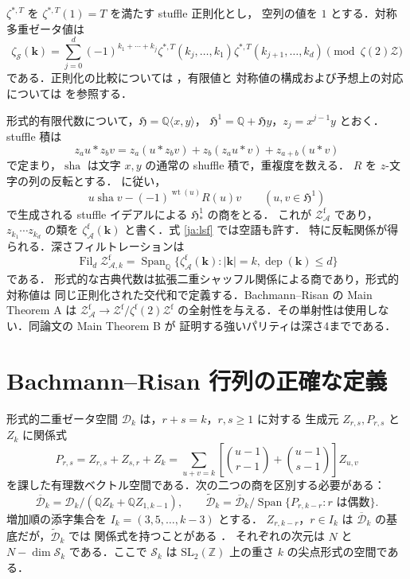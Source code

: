 \documentclass[12pt]{amsart}
\theoremstyle{definition}
\theoremstyle{remark}
\numberwithin{equation}{section}
\newcommand{\sha}{\operatorname{sha}}
\newcommand{\Z}{\mathbb{Z}}
\newcommand{\Q}{\mathbb{Q}}
\newcommand{\Fil}{\operatorname{Fil}}
\newcommand{\Span}{\operatorname{Span}}
\newcommand{\wt}{\operatorname{wt}}
\newcommand{\dep}{\operatorname{dep}}
\newcommand{\ZAf}{\mathcal Z_{\mathcal A}^{\mathrm f}}
\newcommand{\zf}{\zeta_{\mathcal A}^{\mathrm f}}
\newcommand{\Dbar}{\overline{\mathcal D}_k}
\newcommand{\Dtilde}{\widetilde{\mathcal D}_k}
\newcommand{\sh}{\mathbin{\sha}}
\theoremstyle{definition}
\theoremstyle{remark}
\begin{document}
$\zeta^{*,T}$ を $\zeta^{*,T}(1)=T$ を満たす stuffle 正則化とし，
空列の値を $1$ とする．対称多重ゼータ値は
\[
 \zeta_{\mathcal S}(\boldsymbol k)=
 \sum_{j=0}^d(-1)^{k_1+\cdots+k_j}
 \zeta^{*,T}(k_j,\ldots,k_1)
 \zeta^{*,T}(k_{j+1},\ldots,k_d)
 \pmod{\zeta(2)\mathcal Z}
\]
である．正則化の比較については \cite[\S2, Theorem 1]{jIKZ}，有限値と
対称値の構成および予想上の対応については \cite[\S\S7--9]{jKZ} を参照する．

形式的有限代数について，$\mathfrak H=\Q\langle x,y\rangle$，
$\mathfrak H^1=\Q+\mathfrak Hy$，$z_j=x^{j-1}y$ とおく．stuffle 積は
\[
 z_a u*z_b v=z_a(u*z_bv)+z_b(z_au*v)+z_{a+b}(u*v)
\]
で定まり，$\sh$ は文字 $x,y$ の通常の shuffle 積で，重複度を数える．
$R$ を $z$-文字の列の反転とする．\cite[Definition 3.1]{jBR} に従い，
\begin{equation}\label{ja:lsf}
 u\sh v-(-1)^{\wt(u)}R(u)v\qquad(u,v\in\mathfrak H^1)
\end{equation}
で生成される stuffle イデアルによる $\mathfrak H^1_*$ の商をとる．
これが $\ZAf$ であり，$z_{k_1}\cdots z_{k_d}$ の類を
$\zf(\boldsymbol k)$ と書く．式 \eqref{ja:lsf} では空語も許す．
特に反転関係が得られる．深さフィルトレーションは
\[
 \Fil_d\mathcal Z^{\mathrm f}_{\mathcal A,k}
 =\Span_\Q\{\zf(\boldsymbol k):|\boldsymbol k|=k,
                         \dep(\boldsymbol k)\leq d\}
\]
である．
形式的な古典代数は拡張二重シャッフル関係による商であり，形式的対称値は
同じ正則化された交代和で定義する．Bachmann--Risan の Main Theorem A は
$\ZAf\to\mathcal Z^{\mathrm f}/\zeta^{\mathrm f}(2)\mathcal Z^{\mathrm f}$
の全射性を与える．その単射性は使用しない．同論文の Main Theorem B が
証明する強いパリティは深さ4までである．

\section{Bachmann--Risan 行列の正確な定義}
形式的二重ゼータ空間 $\mathcal D_k$ は，$r+s=k$，$r,s\geq1$ に対する
生成元 $Z_{r,s},P_{r,s}$ と $Z_k$ に関係式
\begin{equation}\label{ja:ds}
 P_{r,s}=Z_{r,s}+Z_{s,r}+Z_k
 =\sum_{u+v=k}\left[\binom{u-1}{r-1}+\binom{u-1}{s-1}\right]Z_{u,v}
\end{equation}
を課した有理数ベクトル空間である．次の二つの商を区別する必要がある：
\[
 \Dbar=\mathcal D_k/(\Q Z_k+\Q Z_{1,k-1}),\qquad
 \Dtilde=\Dbar/\Span\{P_{r,k-r}:r\text{ は偶数}\}.
\]
増加順の添字集合を $I_k=(3,5,\ldots,k-3)$ とする．
$Z_{r,k-r}$，$r\in I_k$ は $\Dbar$ の基底だが，$\Dtilde$ では
関係式を持つことがある \cite[Lemma 5.14, Proposition 5.3]{jBR}．
それぞれの次元は $N$ と $N-\dim\mathcal S_k$ である．ここで
$\mathcal S_k$ は $\mathrm{SL}_2(\Z)$ 上の重さ $k$ の尖点形式の空間である．
\end{document}
